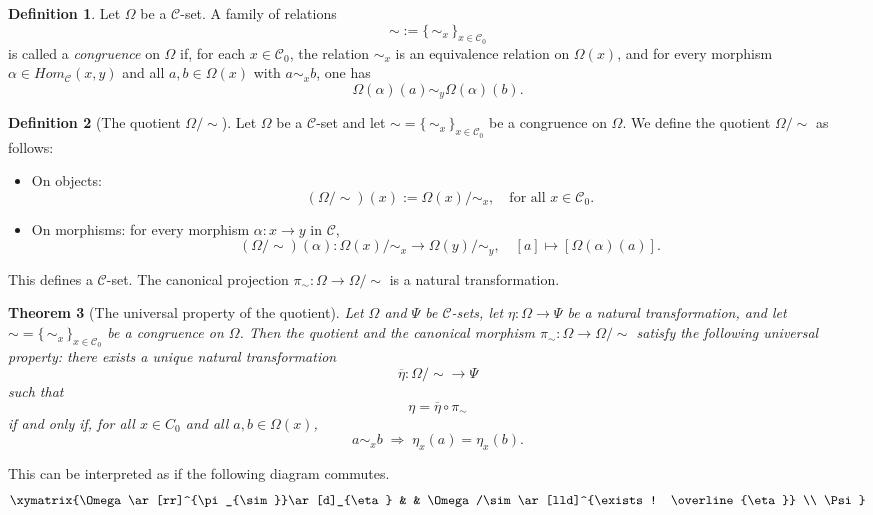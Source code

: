 \documentclass[a4paper]{article}
\newtheorem{thm}{Theorem}[section]
\theoremstyle{definition}
\newtheorem{defi}[thm]{Definition}
\theoremstyle{remark}
\newcommand*{\cat}[1]{\mathcal{#1}}
\newcommand*{\obj}[1]{#1_0}
\begin{document}
\begin{defi}
Let $\Omega$ be a $\cat{C}$-set. A family of relations 
\[
    \sim := \{\, \sim_x \,\}_{x \in \cat{C}_0}
\]
is called a \emph{congruence} on $\Omega$ if, for each $x \in \cat{C}_0$, the relation $\sim_x$ is an equivalence relation on $\Omega(x)$, and for every morphism $\alpha \in Hom_{\cat{C}}(x,y)$ and all $a,b \in \Omega(x)$ with $a \sim_x b$, one has
\[
    \Omega(\alpha)(a) \sim_y \Omega(\alpha)(b).
\]
\end{defi}

\begin{defi}[The quotient $\Omega/\sim$]
Let $\Omega$ be a $\cat{C}$-set and let $\sim = \{\, \sim_x \,\}_{x \in \cat{C}_0}$ be a congruence on $\Omega$. We define the quotient $\Omega/\sim$ as follows:
\begin{itemize}
    \item On objects:
    \[
        (\Omega/\sim)(x) := \Omega(x)/\sim_x, \quad \text{for all } x \in \cat{C}_0.
    \]
    
    \item On morphisms: for every morphism $\alpha \colon x \to y$ in $\cat{C}$,
    \[
        (\Omega/\sim)(\alpha) \colon \Omega(x)/\sim_x \longrightarrow \Omega(y)/\sim_y, 
        \quad [a] \longmapsto [\Omega(\alpha)(a)].
    \]
\end{itemize}
This defines a $\cat{C}$-set. The canonical projection $\pi_{\sim} \colon \Omega \to \Omega/\sim$ is a natural transformation.
\end{defi}
\begin{thm}[The universal property of the quotient]
Let $\Omega$ and $\Psi$ be $\cat{C}$-sets, let $\eta \colon \Omega \to \Psi$ be a natural transformation, and let $\sim = \{\, \sim_x \,\}_{x \in \cat{C}_0}$ be a congruence on $\Omega$. Then the quotient and the canonical morphism $\pi_{\sim} \colon \Omega \to \Omega/\sim$ satisfy the following universal property:
there exists a unique natural transformation
\[
    \overline{\eta} \colon \Omega/\sim \longrightarrow \Psi
\]
such that
\[
    \eta = \overline{\eta} \circ \pi_{\sim}
\]
if and only if, for all $x \in \obj{C}$ and all $a,b \in \Omega(x)$,
\[
    a \sim_x b \;\Rightarrow\; \eta_x(a) = \eta_x(b).
\]
\end{thm}
This can be interpreted as if the following diagram commutes. 
$$\xymatrix{\Omega \ar[rr]^{\pi_{\sim}}\ar[d]_{\eta} & & \Omega/\sim  \ar[lld]^{\exists ! \overline{\eta}}  \\
\Psi} $$
\end{document}
